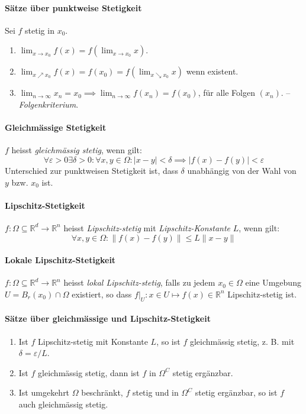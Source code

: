 \documentclass[a4paper, 9pt, DIV=24]{scrartcl}
\newcommand{\R}{\mathbb{R}}
\begin{document}
\paragraph{Sätze über punktweise Stetigkeit}
Sei $f$ stetig in $x_0$.
\begin{enumerate}[label={(}\arabic*{)}]
 \item $\lim_{x\to x_0} f(x) = f(\lim_{x\to x_0} x)$.
 \item $\lim_{x\nearrow x_0} f(x) = f(x_0) = f(\lim_{x\searrow x_0} x)$ wenn existent.
 \item $\lim_{n\to \infty} x_n = x_0 \implies \lim_{n\to \infty} f(x_n) = f(x_0)$, für alle Folgen $(x_n)$. -- \emph{Folgenkriterium}.
\end{enumerate}

\paragraph{Gleichmässige Stetigkeit}
$f$ heisst \emph{gleichmässig stetig}, wenn gilt:
\[\forall\varepsilon>0\exists\delta>0: \forall x,y \in \Omega: |x-y| < \delta \implies |f(x) - f(y)| < \varepsilon \]
Unterschied zur punktweisen Stetigkeit ist, dass $\delta$ unabhängig von der Wahl von $y$ bzw. $x_0$ ist.

\paragraph{Lipschitz-Stetigkeit}
$f: \Omega \subseteq \R^d \rightarrow \R^n$ heisst \emph{Lipschitz-stetig} mit \emph{Lipschitz-Konstante} $L$, wenn gilt:
\[ \forall x,y\in\Omega: \|f(x)-f(y)\| \leq L\|x-y\|\]

\paragraph{Lokale Lipschitz-Stetigkeit}
$f: \Omega \subseteq \R^d \rightarrow \R^n$ heisst \emph{lokal Lipschitz-stetig},
falls zu jedem $x_0\in\Omega$ eine Umgebung $U = B_r(x_0)\cap\Omega$ existiert,
so dass $f|_U : x \in U \mapsto f(x) \in \R^n$ Lipschitz-stetig ist.


\paragraph{Sätze über gleichmässige und Lipschitz-Stetigkeit}
\begin{enumerate}[label={(}\arabic*{)}]
 \item Ist $f$ Lipschitz-stetig mit Konstante $L$, so ist $f$ gleichmässig stetig, z. B. mit $\delta = \varepsilon/L$.
 \item Ist $f$ gleichmässig stetig, dann ist $f$ in $\Omega^C$ stetig ergänzbar.
 \item Ist umgekehrt $\Omega$ beschränkt, $f$ stetig und in $\Omega^C$ stetig ergänzbar, so ist $f$ auch gleichmässig stetig.
\end{enumerate}
\end{document}
